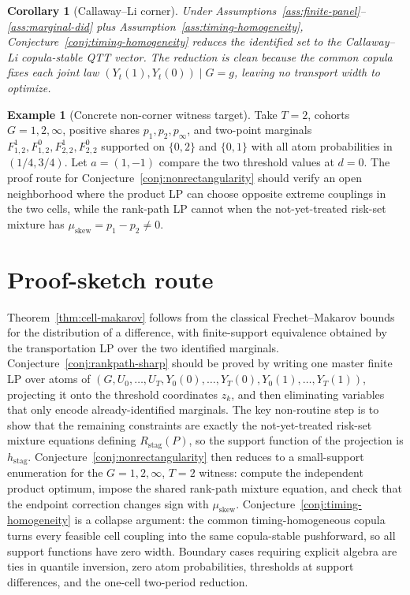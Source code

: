 \documentclass[11pt]{article}
\theoremstyle{definition}
\newtheorem{example}{Example}
\theoremstyle{plain}
\newtheorem{corollary}{Corollary}
\theoremstyle{remark}
\begin{document}
\begin{corollary}[Callaway--Li corner]\label{cor:clcorner}
Under Assumptions~\ref{ass:finite-panel}--\ref{ass:marginal-did} plus Assumption~\ref{ass:timing-homogeneity}, Conjecture~\ref{conj:timing-homogeneity} reduces the identified set to the Callaway--Li copula-stable QTT vector.  The reduction is clean because the common copula fixes each joint law \((Y_t(1),Y_t(0))\mid G=g\), leaving no transport width to optimize.
\end{corollary}

\begin{example}[Concrete non-corner witness target]\label{ex:witness}
Take \(T=2\), cohorts \(G=1,2,\infty\), positive shares \(p_1,p_2,p_\infty\), and two-point marginals \(F^1_{1,2},F^0_{1,2},F^1_{2,2},F^0_{2,2}\) supported on \(\{0,2\}\) and \(\{0,1\}\) with all atom probabilities in \((1/4,3/4)\).  Let \(a=(1,-1)\) compare the two threshold values at \(d=0\).  The proof route for Conjecture~\ref{conj:nonrectangularity} should verify an open neighborhood where the product LP can choose opposite extreme couplings in the two cells, while the rank-path LP cannot when the not-yet-treated risk-set mixture has \(\mu_{\mathrm{skew}}=p_1-p_2\ne0\).
\end{example}

\section{Proof-sketch route}
Theorem~\ref{thm:cell-makarov} follows from the classical Frechet--Makarov bounds for the distribution of a difference, with finite-support equivalence obtained by the transportation LP over the two identified marginals.  Conjecture~\ref{conj:rankpath-sharp} should be proved by writing one master finite LP over atoms of \((G,U_0,\ldots,U_T,Y_0(0),\ldots,Y_T(0),Y_0(1),\ldots,Y_T(1))\), projecting it onto the threshold coordinates \(z_k\), and then eliminating variables that only encode already-identified marginals.  The key non-routine step is to show that the remaining constraints are exactly the not-yet-treated risk-set mixture equations defining \(R_{\mathrm{stag}}(P)\), so the support function of the projection is \(h_{\mathrm{stag}}\).  Conjecture~\ref{conj:nonrectangularity} then reduces to a small-support enumeration for the \(G=1,2,\infty\), \(T=2\) witness: compute the independent product optimum, impose the shared rank-path mixture equation, and check that the endpoint correction changes sign with \(\mu_{\mathrm{skew}}\).  Conjecture~\ref{conj:timing-homogeneity} is a collapse argument: the common timing-homogeneous copula turns every feasible cell coupling into the same copula-stable pushforward, so all support functions have zero width.  Boundary cases requiring explicit algebra are ties in quantile inversion, zero atom probabilities, thresholds at support differences, and the one-cell two-period reduction.
\end{document}
